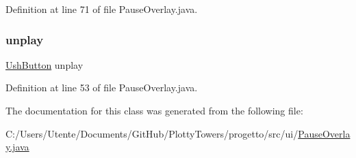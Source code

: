 Definition at line 71 of file Pause\+Overlay.\+java.

\mbox{\label{classui_1_1_pause_overlay_adf4b295ca065e549d8c0d4d409309b78}} 
\subsubsection{\texorpdfstring{unplay}{unplay}}
{\footnotesize\ttfamily \hyperlink{classui_1_1_ush_button}{Ush\+Button} unplay\hspace{0.3cm}{\ttfamily [private]}}



Definition at line 53 of file Pause\+Overlay.\+java.



The documentation for this class was generated from the following file\+:\begin{DoxyCompactItemize}
\item 
C\+:/\+Users/\+Utente/\+Documents/\+Git\+Hub/\+Plotty\+Towers/progetto/src/ui/\hyperlink{_pause_overlay_8java}{Pause\+Overlay.\+java}\end{DoxyCompactItemize}
